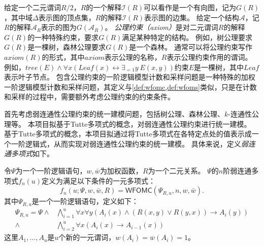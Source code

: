 \documentclass[12pt,UTF8,AutoFakeBold=3,a4paper]{ctexart} %
\newcommand{\weight}{w}
\newcommand{\negweight}{\bar{w}}
\newcommand{\symwfomc}{\ensuremath{\mathsf{WFOMC}}}
\newcommand{\domain}{\Delta}
\newcommand{\structure}{\mathcal{A}}
\begin{document}
给定一个二元谓词$R/2$，$R$的一个解释$\mathcal{I}(R)$可以看作是一个有向图，记为$G(R)$，其中域$\domain$表示图的顶点集，$R$的解释$\mathcal{I}(R)$表示图的边集。
给定一个结构$\structure$，记$R$的解释$\structure_R$表示的图为$G(\structure_R)$。
\emph{公理约束（axiom）}是对二元谓词$R$的解释$G(R)$的一种特殊约束，要求$G(R)$满足某种特定的结构。
例如，树公理要求$G(R)$是一棵树，森林公理要求$G(R)$是一个森林。
通常可以将公理约束写作$axiom(R)$的形式，其中$axiom$表示公理的名称，$R$表示公理约束作用的谓词。
例如，$tree(E) \land \forall x \left( Leaf(x)\leftrightarrow \exists_{=1} y \ E(x,y) \right)$约束$E$是一棵树，其中$Leaf$表示叶子节点。
包含公理约束的一阶逻辑模型计数和采样问题是一种特殊的加权一阶逻辑模型计数和采样问题，其定义与\cref{def:wfomc,def:wfoms}类似，只是在计数和采样的过程中，需要额外考虑公理约束的约束条件。


首先考虑弱连通性公理约束的统一建模问题，包括树公理、森林公理、$k$-连通性公理等。
本项目拟基于Tutte多项式的概念，对弱连通性公理约束进行统一建模。
基于Tutte多项式的概念，本项目拟通过将Tutte多项式在各特定点处的值表示成一个一阶逻辑式，从而实现对弱连通性公理约束的统一建模。
具体来说，定义\emph{弱连通多项式}如下。

\begin{definition}[弱连通多项式]\label{def:wcp}
  令$\Psi$为一个一阶逻辑语句，$\weight, \negweight$为加权函数，$R$为一个二元关系。
  $\Psi$的$n$阶弱连通多项式$f_n(u)$定义为满足以下条件的一元多项式：
  \begin{equation*}
  f_n(u;\Psi, \weight, \negweight, R) = \symwfomc(\Psi_{R,u}, n, \weight, \negweight).
  \end{equation*}
  其中$\Psi_{R,u}$是一个一阶逻辑语句，定义如下：
  \begin{equation}
    \begin{aligned}
      \Psi_{R,u} = \Psi \wedge & \bigwedge_{i=1}^u \forall x \forall y \left( A_i(x) \wedge (R(x,y) \vee R(y,x)) \to A_i(y) \right) \\
      \wedge & \bigwedge_{i = 2}^u \forall x \left( A_i(x) \to A_{i-1}(x) \right)
    \end{aligned}
    \label{eq:wcp}
  \end{equation}
  这里$A_1, \dots, A_u$是$u$个新的一元谓词，$w(A_i) = \overline{w}(A_i) = 1$。
\end{definition}
\end{document}
